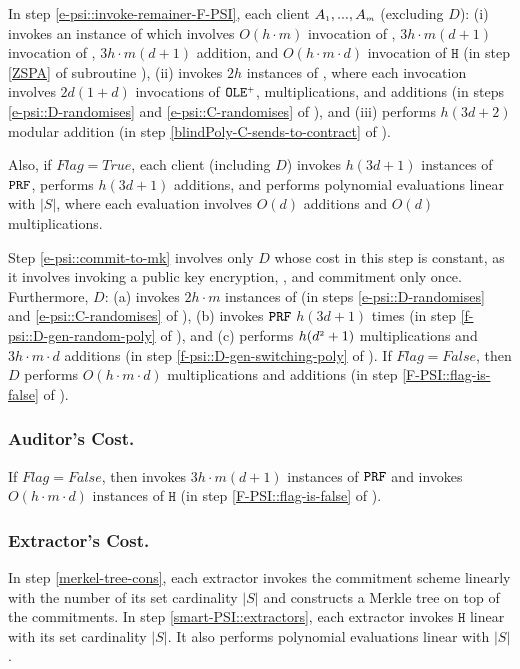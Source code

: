 In step \ref{e-psi::invoke-remainer-F-PSI}, each client   $A_{\scriptscriptstyle  1},...,    A_{\scriptscriptstyle   m}$ (excluding $D$): (i) invokes an instance of \zspaa which involves $O(h\cdot m)$ invocation of \ct, $3h\cdot m (d+1)$ invocation of \prf, $3h\cdot m (d+1)$ addition, and $O(h\cdot m\cdot d)$ invocation of $\mathtt{H}$ (in step \ref{ZSPA} of subroutine \fpsi), (ii) invokes $2h$ instances of \vopr, where each \vopr invocation involves $2d(1+d)$ invocations of $\mathtt{OLE}^{\scriptscriptstyle +}$, multiplications, and additions  (in steps \ref{e-psi::D-randomises} and \ref{e-psi::C-randomises} of \fpsi), and (iii) performs $h(3d+2)$ modular addition (in step \ref{blindPoly-C-sends-to-contract} of  \fpsi).  
 
 Also, if $Flag=True$, each client (including $D$) invokes $h (3d+1)$ instances of $\mathtt{PRF}$,  performs $h (3d+1)$ additions, and performs polynomial evaluations linear with $|S|$, where each evaluation involves  $O(d)$  additions and $O(d)$ multiplications.%
 
 Step \ref{e-psi::commit-to-mk} involves only $D$ whose cost in this step is constant, as it involves invoking a public key encryption, \prf,  and commitment only once. Furthermore, $D$:  (a) invokes $2h\cdot m$ instances of \vopr  (in steps \ref{e-psi::D-randomises} and \ref{e-psi::C-randomises} of \fpsi), (b) invokes $\mathtt{PRF}$ $h(3d+1)$ times (in step \ref{f-psi::D-gen-random-poly} of \fpsi), and (c) performs $h(d^{\scriptscriptstyle 2}+1)$ multiplications and $3h\cdot m\cdot d$ additions (in step \ref{f-psi::D-gen-switching-poly} of \fpsi). If $Flag=False$, then $D$ performs $O(h\cdot m\cdot d)$ multiplications and additions (in step \ref{F-PSI::flag-is-false} of \fpsi).  

\vspace{-5mm}
 \subsubsection{Auditor's Cost.}
 
If $Flag=False$, then \aud invokes $3h\cdot m(d+1)$ instances of $\mathtt{PRF}$ and  invokes $O(h\cdot m\cdot d)$ instances of $\mathtt{H}$ (in step \ref{F-PSI::flag-is-false} of \fpsi). 


\vspace{-5mm}
 \subsubsection{Extractor's Cost.}
 
 
 In step \ref{merkel-tree-cons}, each extractor invokes the commitment scheme linearly with the number of its set cardinality $|S|$ and constructs a Merkle tree on top of the commitments. %
%
In step \ref{smart-PSI::extractors}, each extractor invokes $\mathtt{H}$ linear with its set cardinality $|S|$. It also performs polynomial evaluations linear with $|S|$. 

